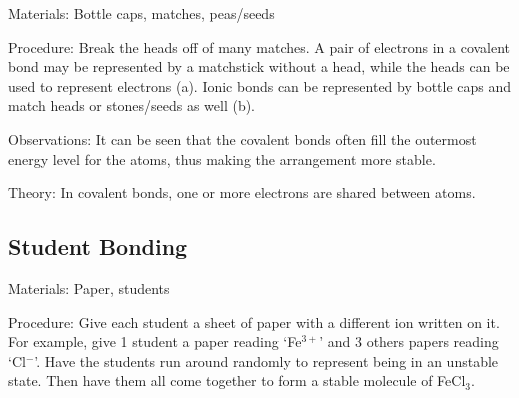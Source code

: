 \begin{multicols}{2}
\begin{description*}
\item[Materials:]{Bottle caps, matches, peas/seeds}
\item[Procedure:]{Break the heads off of many matches. A pair of electrons in a covalent bond may be
represented by a matchstick without a  head, while the heads can be used to represent electrons (a). Ionic bonds can be represented by bottle caps
and match heads or stones/seeds as well (b).}
\item[Observations:]{It can be seen that the covalent bonds often fill the outermost energy level for the atoms, thus making the arrangement more stable.}
\item[Theory:]{In covalent bonds, one or more electrons are shared between atoms.}
\end{description*}

\subsection{Student Bonding}


\begin{description*}
\item[Materials:]{Paper, students}
\item[Procedure:]{Give each student a sheet of paper with a different ion written on it. For example, give 1 student a paper reading `Fe$^{3+}$' and 3 others papers reading `Cl$^-$'. Have the students run around randomly to represent being in an unstable state. Then have them all come together to form a stable molecule of FeCl$_3$.}
\end{description*}


\end{multicols}
